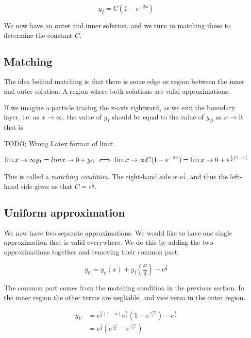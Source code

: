 \documentclass[12pt]{article}
\begin{document}
\begin{equation}
y_I = C(1 - e^{-2\overline{x}})
\end{equation}

We now have an outer and inner solution, and we turn to matching these to
determine the constant $C$.

\subsection{Matching}

The idea behind matching is that there is some edge or region between the inner
and outer solution. A region where both solutions are valid approximations.

If we imagine a particle tracing the x-axis rightward, as we exit the boundary
layer, i.e. as $\overline{x} \to \infty$, the value of $y_I$ should be equal to
the value of $y_O$ as $x \to 0$, that is

TODO: Wrong Latex format of limit.

\begin{equation}
\lim \overline{x} \to \infty y_I = \\lim x \to 0+ y_O \iff 
\lim \overline{x} \to \infty C(1 - e^{-2\overline{x}}) = \lim x \to 0+ e^{\frac{1}{2}(1-x)}
\end{equation}

This is called a \textit{matching condition}. The right-hand side is
$e^{\frac{1}{2}}$, and thus the left-hand side gives us that $C =
e^{\frac{1}{2}}$.

\subsection{Uniform approximation}

We now have two separate approximations. We would like to have one single
approximation that is valid everywhere. We do this by adding the two
approximations together and removing their common part.

\begin{equation}
y_U = y_o(x) + y_I(\frac{x}{\delta}) - e^{\frac{1}{2}}
\end{equation}

The common part comes from the matching condition in the previous section. In
the inner region the other terms are negliable, and vice versa in the outer
region.

\begin{align}
y_U &= e^{\frac{1}{2}(1-x)} e^{\frac{1}{2}}(1 - e^{\frac{-2x}{\epsilon}}) -
e^{\frac{1}{2}} \\
    &=  e^{\frac{1}{2}}(e^{\frac{-x}{2}} - e^{\frac{-2x}{\epsilon}})
\end{align}
\end{document}
